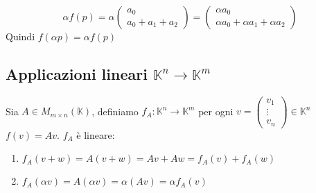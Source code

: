 \documentclass[a4paper]{article}
\theoremstyle{break}
\theoremstyle{break}
\theoremstyle{break}
\theoremstyle{break}
\begin{document}
\begin{example}
\begin{enumerate}
      \vspace{1em}
      \[
      \alpha f(p) = \alpha \begin{pmatrix} 
        a_0 \\
        a_0 + a_1 + a_2
      \end{pmatrix} 
      =
      \begin{pmatrix} 
        \alpha a_0\\
        \alpha a_0 + \alpha a_1 + \alpha a_2
      \end{pmatrix} 
      \] 
      Quindi \( f(\alpha p) = \alpha f(p) \) 
  \end{enumerate}
\end{example}

\subsection{Applicazioni lineari \texorpdfstring{\( \mathbb{K}^n \to \mathbb{K}^m \)}{K\^n -> K\^m}}
\label{7.2}
Sia \( A \in  M_{m \times n}(\mathbb{K}) \), definiamo \( f_A: \mathbb{K}^n \to \mathbb{K}^m \) 
per ogni \( v = \begin{pmatrix} 
  v_1\\
  \vdots\\
  v_n
\end{pmatrix} \in \mathbb{K}^n\) \( f(v) = Av \). \( f_A \) è lineare:
\begin{enumerate}
  \item \( f_A(v+w) = A(v+w) = Av + Aw = f_A(v) + f_A(w) \) 

  \item \( f_A(\alpha v) = A(\alpha v) = \alpha(Av) = \alpha f_A(v) \) 
\end{enumerate}
\end{document}
